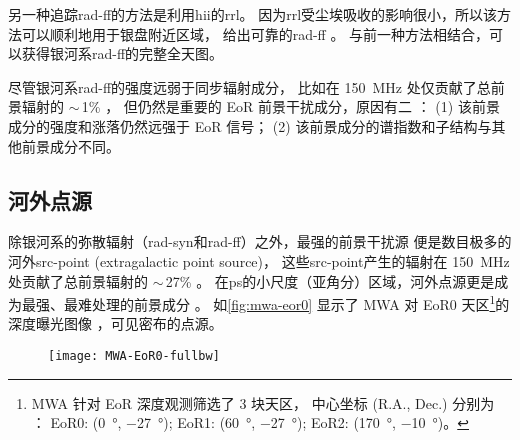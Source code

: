 另一种追踪\ac{rad-ff}的方法是利用\ac{hii}的\ac{rrl}。
因为\ac{rrl}受尘埃吸收的影响很小，所以该方法可以顺利地用于银盘附近区域，
给出可靠的\ac{rad-ff} \cite{alves2010,alves2012}。
与前一种方法相结合，可以获得银河系\ac{rad-ff}的完整全天图。

尽管银河系\ac{rad-ff}的强度远弱于同步辐射成分，
比如在 \SI{150}{\MHz} 处仅贡献了总前景辐射的 $\sim$\,1\% \cite{shaver1999}，
但仍然是重要的 EoR 前景干扰成分，原因有二 \cite{jelic2008}：
(1) 该前景成分的强度和涨落仍然远强于 EoR 信号；
(2) 该前景成分的谱指数和子结构与其他前景成分不同。

\subsection{河外点源}

除银河系的弥散辐射（\ac{rad-syn}和\ac{rad-ff}）之外，最强的前景干扰源
便是数目极多的河外\acs{src-point} (extragalactic point source)，
这些\ac{src-point}产生的辐射在 \SI{150}{\MHz} 处贡献了总前景辐射的
$\sim$\,27\% \cite{shaver1999}。
在\ac{ps}的小尺度（亚角分）区域，河外点源更是成为最强、最难处理的前景成分
\cite{murray2017,procopio2017,yoshiura2018}。
如\autoref{fig:mwa-eor0} 显示了 MWA 对 EoR0 天区\footnote{%
  MWA 针对 EoR 深度观测筛选了 3 块天区，
  中心坐标 (R.A., Dec.\@) 分别为 \cite{beardsley2016}：
  EoR0: (\SI{0}{\degree}, \SI{-27}{\degree});
  EoR1: (\SI{60}{\degree}, \SI{-27}{\degree});
  EoR2: (\SI{170}{\degree}, \SI{-10}{\degree})。
}的深度曝光图像 \cite{offringa2016}，可见密布的点源。

\begin{figure}[htp]
  \centering
  \texttt{[image: MWA-EoR0-fullbw]}
  \label{fig:mwa-eor0}
\end{figure}

